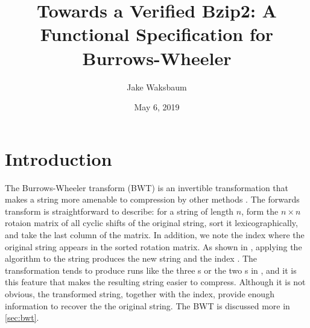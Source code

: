 \documentclass[11pt]{thesis}
\title{Towards a Verified Bzip2: A Functional Specification for Burrows-Wheeler}
\author{Jake Waksbaum}
\date{May 6, 2019}
\begin{document}
\maketitle

\section{Introduction}
\label{sec:intro}

The Burrows-Wheeler transform (BWT) is an invertible transformation
that makes a string more amenable to compression by other methods
\cite{bw}. The forwards transform is straightforward to describe: for
a string of length \(n\), form the \(n \times n\) rotaion matrix of all
cyclic shifts of the original string, sort it lexicographically, and
take the last column of the matrix. In addition, we note the index
where the original string appears in the sorted rotation matrix. As
shown in , applying the algorithm to the string
 produces the new string  and
the index . The transformation tends to produce runs like
the three s or the two s in ,
and it is this feature that makes the resulting string easier to
compress. Although it is not obvious, the transformed string, together
with the index, provide enough information to recover the the original
string. The BWT is discussed more in \cref{sec:bwt}.
\end{document}
